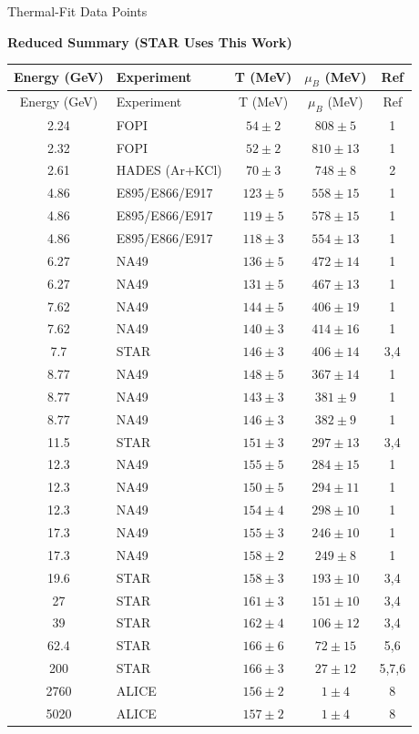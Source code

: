 \documentclass[10pt]{article}
\begin{document}
\begin{center}
\Large Thermal-Fit Data Points
\end{center}
\vspace{0.1em}
\begin{center}
\normalsize
\textbf{Reduced Summary (STAR Uses This Work)}
\end{center}
\small
\begin{longtable}{c l c c c}
\toprule
Energy (GeV) & Experiment & T (MeV) & $\mu_B$ (MeV) & Ref \\
\midrule
\endfirsthead
\toprule
Energy (GeV) & Experiment & T (MeV) & $\mu_B$ (MeV) & Ref \\
\midrule
\endhead
  2.24 & FOPI & $54 \pm 2$ & $808 \pm 5$ & 1 \\
  2.32 & FOPI & $52 \pm 2$ & $810 \pm 13$ & 1 \\
  2.61 & HADES (Ar+KCl) & $70 \pm 3$ & $748 \pm 8$ & 2 \\
  4.86 & E895/E866/E917 & $123 \pm 5$ & $558 \pm 15$ & 1 \\
  4.86 & E895/E866/E917 & $119 \pm 5$ & $578 \pm 15$ & 1 \\
  4.86 & E895/E866/E917 & $118 \pm 3$ & $554 \pm 13$ & 1 \\
  6.27 & NA49 & $136 \pm 5$ & $472 \pm 14$ & 1 \\
  6.27 & NA49 & $131 \pm 5$ & $467 \pm 13$ & 1 \\
  7.62 & NA49 & $144 \pm 5$ & $406 \pm 19$ & 1 \\
  7.62 & NA49 & $140 \pm 3$ & $414 \pm 16$ & 1 \\
  7.7 & STAR & $146 \pm 3$ & $406 \pm 14$ & 3,4 \\
  8.77 & NA49 & $148 \pm 5$ & $367 \pm 14$ & 1 \\
  8.77 & NA49 & $143 \pm 3$ & $381 \pm 9$ & 1 \\
  8.77 & NA49 & $146 \pm 3$ & $382 \pm 9$ & 1 \\
  11.5 & STAR & $151 \pm 3$ & $297 \pm 13$ & 3,4 \\
  12.3 & NA49 & $155 \pm 5$ & $284 \pm 15$ & 1 \\
  12.3 & NA49 & $150 \pm 5$ & $294 \pm 11$ & 1 \\
  12.3 & NA49 & $154 \pm 4$ & $298 \pm 10$ & 1 \\
  17.3 & NA49 & $155 \pm 3$ & $246 \pm 10$ & 1 \\
  17.3 & NA49 & $158 \pm 2$ & $249 \pm 8$ & 1 \\
  19.6 & STAR & $158 \pm 3$ & $193 \pm 10$ & 3,4 \\
  27 & STAR & $161 \pm 3$ & $151 \pm 10$ & 3,4 \\
  39 & STAR & $162 \pm 4$ & $106 \pm 12$ & 3,4 \\
  62.4 & STAR & $166 \pm 6$ & $72 \pm 15$ & 5,6 \\
  200 & STAR & $166 \pm 3$ & $27 \pm 12$ & 5,7,6 \\
  2760 & ALICE & $156 \pm 2$ & $1 \pm 4$ & 8 \\
  5020 & ALICE & $157 \pm 2$ & $1 \pm 4$ & 8 \\
\bottomrule
\end{longtable}
\end{document}
